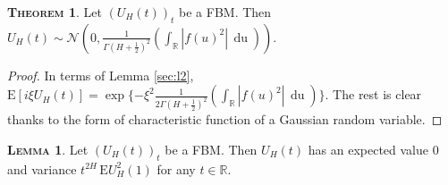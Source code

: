\documentclass[a4paper, twoside, 11pt]{article}
\theoremstyle{definition}
\newtheorem{theorem}[definition]{\scshape Theorem}
\newtheorem{lemma}[definition]{\scshape Lemma}
\begin{document}
\begin{theorem}
  Let $(U_H(t))_t$ be a FBM. Then $U_H(t) \sim \mathcal{N}(0, \frac{1}{\Gamma(H+\frac{1}{2})^2}(\int_{\mathbb{R}} |f(u)^2|\, \mathop{du}))$.
  \label{sec:the1}
\end{theorem}
\begin{proof}
  In terms of Lemma \ref{sec:l2}, $\mathrm{E}[i\xi U_H(t)] = \exp\{-\xi^2 \frac{1}{2\Gamma(H+\frac{1}{2})^2}(\int_{\mathbb{R}} |f(u)^2|\, \mathop{du})\}$. The rest is clear thanks to the form of characteristic function of a Gaussian random variable.
\end{proof}
\begin{lemma}
  Let $(U_H(t))_t$ be a FBM. Then $U_H(t)$ has an expected value $0$ and variance $t^{2H}\, \mathrm{E} U^2_H(1)$ for any $t \in \mathbb{R}$.
  \label{sec:fbmp1}
\end{lemma}
\end{document}
